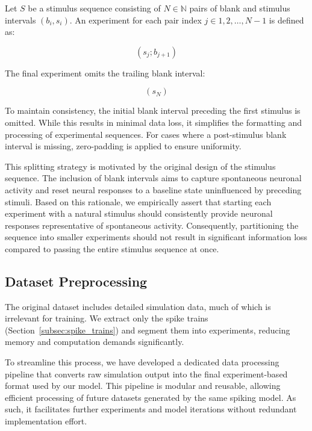 \begin{defn}[Experiment]
    Let $S$ be a stimulus sequence consisting of $N \in \mathbb{N}$ pairs of blank and stimulus intervals $(b_i, s_i)$. An experiment for each pair index $j \in {1, 2, \dots, N-1}$ is defined as:

    $$
    \left(s_j; b_{j+1}\right)
    $$

    The final experiment omits the trailing blank interval:

    $$
    \left(s_N\right)
    $$
\end{defn}
\label{def:experiment}

To maintain consistency, the initial blank interval preceding the first stimulus is omitted. While this results in minimal data loss, it simplifies the formatting and processing of experimental sequences. For cases where a post-stimulus blank interval is missing, zero-padding is applied to ensure uniformity.

This splitting strategy is motivated by the original design of the stimulus sequence. The inclusion of blank intervals aims to capture spontaneous neuronal activity and reset neural responses to a baseline state uninfluenced by preceding stimuli. Based on this rationale, we empirically assert that starting each experiment with a natural stimulus should consistently provide neuronal responses representative of spontaneous activity. Consequently, partitioning the sequence into smaller experiments should not result in significant information loss compared to passing the entire stimulus sequence at once.

\subsection{Dataset Preprocessing}
\label{subsec:dataset_preprocess}
The original dataset includes detailed simulation data, much of which is irrelevant for training. We extract only the spike trains (Section~\ref{subsec:spike_trains}) and segment them into experiments, reducing memory and computation demands significantly.

To streamline this process, we have developed a dedicated data processing pipeline that converts raw simulation output into the final experiment-based format used by our model. This pipeline is modular and reusable, allowing efficient processing of future datasets generated by the same spiking model. As such, it facilitates further experiments and model iterations without redundant implementation effort.


